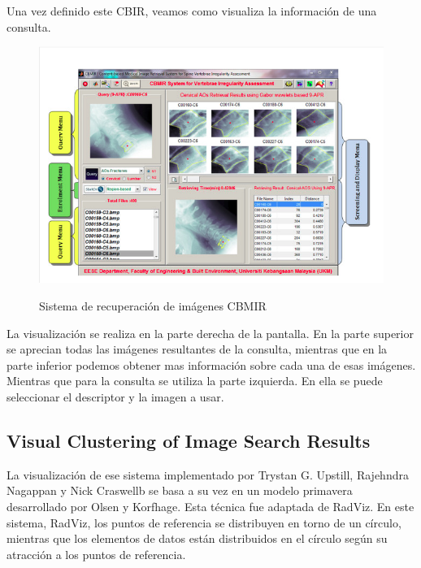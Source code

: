 Una vez definido este CBIR, veamos como visualiza la información de una consulta.\\

\begin{figure}[H] %
\centering
\includegraphics[scale=0.5]{imagenes/CBMIR.png}  %
\label{CBMIR}
\caption{Sistema de recuperación de imágenes CBMIR}
\end{figure}

La visualización se realiza en la parte derecha de la pantalla. En la parte superior se aprecian todas las imágenes resultantes de la consulta, mientras que en la parte inferior podemos obtener mas información sobre cada una de esas imágenes.\\

Mientras que para la consulta se utiliza la parte izquierda. En ella se puede seleccionar el descriptor y la imagen a usar.\\

\subsection{Visual Clustering of Image Search Results}

La visualización de ese sistema implementado por Trystan G. Upstill, Rajehndra Nagappan y Nick Craswellb se basa a su vez en un modelo primavera desarrollado por Olsen y Korfhage. Esta técnica fue adaptada de RadViz. En este sistema, RadViz, los puntos de referencia se distribuyen en torno de un círculo, mientras que los elementos de datos están distribuidos en el círculo según su atracción a los puntos de referencia.\\

